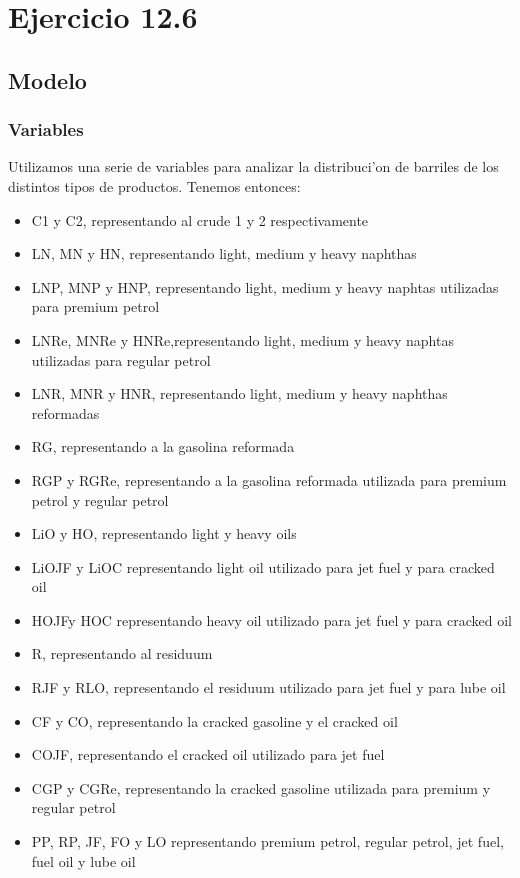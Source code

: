 \section{Ejercicio 12.6}
\subsection{Modelo}
\subsubsection{Variables}
Utilizamos una serie de variables para analizar la distribuci'on de barriles de los distintos tipos de productos. Tenemos entonces: 
\begin{itemize}
\item C1 y C2, representando al crude 1 y 2 respectivamente
\item  LN, MN y HN, representando light, medium y heavy naphthas
\item LNP, MNP y HNP, representando light, medium y heavy naphtas utilizadas para premium petrol
\item LNRe, MNRe y HNRe,representando light, medium y heavy naphtas utilizadas para regular petrol
\item LNR, MNR y HNR, representando light, medium y heavy naphthas reformadas
\item RG, representando a la gasolina reformada
\item RGP y RGRe, representando a la gasolina reformada utilizada para premium petrol y regular petrol
\item LiO y HO, representando light y heavy oils
\item LiOJF y LiOC representando light oil utilizado para jet fuel y para cracked oil
\item HOJFy HOC representando heavy oil utilizado para jet fuel y para cracked oil
\item R, representando al residuum
\item RJF y RLO, representando el residuum utilizado para jet fuel y para lube oil
\item CF y CO, representando la cracked gasoline y el cracked oil
\item COJF, representando el cracked oil utilizado para jet fuel
\item CGP y CGRe, representando la cracked gasoline utilizada para premium y regular petrol
\item PP, RP, JF, FO y LO representando premium petrol, regular petrol, jet fuel, fuel oil y lube oil
\end{itemize}
